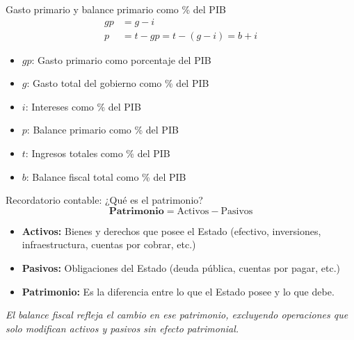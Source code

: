 \begin{frame}{Gasto primario y balance primario como \% del PIB}
\begin{align*}
gp &= g - i \\
p &= t - gp = t - (g - i) = b + i
\end{align*}
\vspace{0.5em}
\begin{itemize}
  \item $gp$: Gasto primario como porcentaje del PIB
  \item $g$: Gasto total del gobierno como \% del PIB
  \item $i$: Intereses como \% del PIB
  \item $p$: Balance primario como \% del PIB
  \item $t$: Ingresos totales como \% del PIB
  \item $b$: Balance fiscal total como \% del PIB
\end{itemize}
\end{frame}

\begin{frame}{Recordatorio contable: ¿Qué es el patrimonio?}
\begin{equation*}
\textbf{Patrimonio} = \text{Activos} - \text{Pasivos}
\end{equation*}

\vspace{1em}
\begin{itemize}
  \item \textbf{Activos:} Bienes y derechos que posee el Estado (efectivo, inversiones, infraestructura, cuentas por cobrar, etc.)
  \item \textbf{Pasivos:} Obligaciones del Estado (deuda pública, cuentas por pagar, etc.)
  \item \textbf{Patrimonio:} Es la diferencia entre lo que el Estado posee y lo que debe.
\end{itemize}

\vspace{1em}
\textit{El balance fiscal refleja el cambio en ese patrimonio, excluyendo operaciones que solo modifican activos y pasivos sin efecto patrimonial.}
\end{frame}


